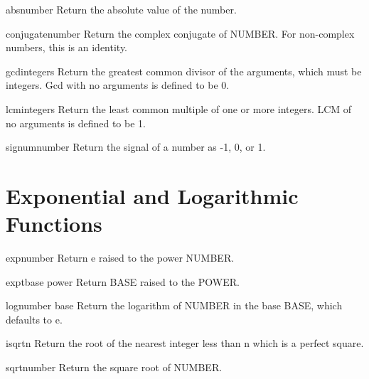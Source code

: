 \begin{function}{abs}{number}{}{}
  Return the absolute value of the number.
\end{function}

\begin{function}{conjugate}{number}{}{}
  Return the complex conjugate of NUMBER. For non-complex numbers, this is
  an identity.
\end{function}

\begin{function}{gcd}{\rest integers}{}{}
  Return the greatest common divisor of the arguments, which must be
  integers. Gcd with no arguments is defined to be 0.
\end{function}

\begin{function}{lcm}{\rest integers}{}{}
  Return the least common multiple of one or more integers. LCM of no
  arguments is defined to be 1.
\end{function}

\begin{function}{signum}{number}{}{}
  Return the signal of a number as -1, 0, or 1.
\end{function}

\section{Exponential and Logarithmic Functions}
\label{sec:expon-logar-funct}

\begin{function}{exp}{number}{}{}
  Return e raised to the power NUMBER.
\end{function}

\begin{function}{expt}{base power}{}{}
  Return BASE raised to the POWER.
\end{function}

\begin{function}{log}{number \op base}{}{}
  Return the logarithm of NUMBER in the base BASE, which defaults to e.
\end{function}

\begin{function}{isqrt}{n}{}{}
  Return the root of the nearest integer less than n which is a perfect
   square.
\end{function}

\begin{function}{sqrt}{number}{}{}
  Return the square root of NUMBER.
\end{function}


